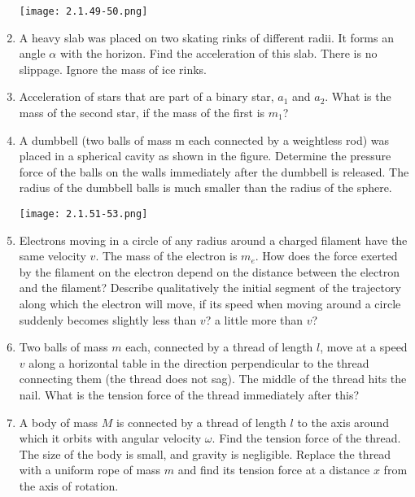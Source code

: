 \documentclass{article}
\begin{document}
\begin{enumerate}[label=2.1.\arabic*]
\begin{center}
    \texttt{[image: 2.1.49-50.png]}
\end{center}

\item A heavy slab was placed on two skating rinks of different radii. It forms an angle $\alpha$ with the horizon. Find the acceleration of this slab. There is no slippage. Ignore the mass of ice rinks.

\item Acceleration of stars that are part of a binary star, $a_1$ and $a_2$. What is the mass of the second star, if the mass of the first is $m_1$?

\item A dumbbell (two balls of mass m each connected by a weightless rod) was placed in a spherical cavity as shown in the figure. Determine the pressure force of the balls on the walls immediately after the dumbbell is released. The radius of the dumbbell balls is much smaller than the radius of the sphere.

\begin{center}
    \texttt{[image: 2.1.51-53.png]}
\end{center}

\item Electrons moving in a circle of any radius around a charged filament have the same velocity $v$. The mass of the electron is $m_e$. How does the force exerted by the filament on the electron depend on the distance between the electron and the filament? Describe qualitatively the initial segment of the trajectory along which the electron will move, if its speed when moving around a circle suddenly becomes slightly less than $v$? a little more than $v$?

\item Two balls of mass $m$ each, connected by a thread of length $l$, move at a speed $v$ along a horizontal table in the direction perpendicular to the thread connecting them (the thread does not sag). The middle of the thread hits the nail. What is the tension force of the thread immediately after this?

\item A body of mass $M$ is connected by a thread of length $l$ to the axis around which it orbits with angular velocity $\omega$. Find the tension force of the thread. The size of the body is small, and gravity is negligible. Replace the thread with a uniform rope of mass $m$ and find its tension force at a distance $x$ from the axis of rotation.


\end{enumerate}
\end{document}
